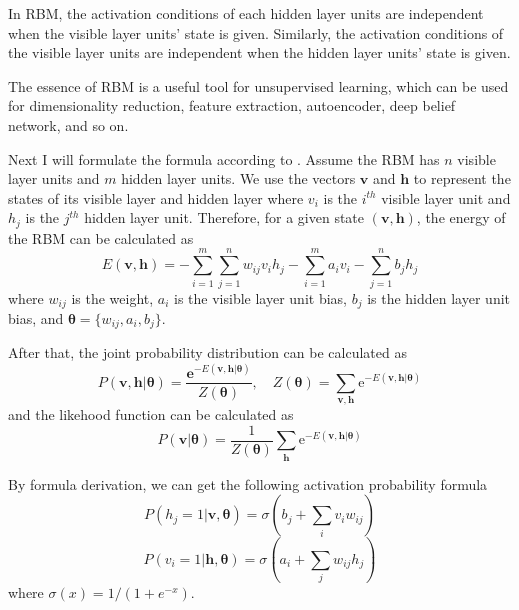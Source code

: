 \documentclass{bioinfo}
\begin{document}
In RBM, the activation conditions of each hidden layer units are independent when the visible layer units' state is given. Similarly, the activation conditions of the visible layer units are independent when the hidden layer units' state is given.

The essence of RBM is a useful tool for unsupervised learning, which can be used for dimensionality reduction, feature extraction, autoencoder, deep belief network, and so on.

Next I will formulate the formula according to \cite{zhangchunxia}. Assume the RBM has $n$ visible layer units and $m$ hidden layer units. We use the vectors $\mathbf{v}$ and $\mathbf{h}$ to represent the states of its visible layer and hidden layer where $v_i$ is the $i^{th}$ visible layer unit and $h_j$ is the $j^{th}$ hidden layer unit. Therefore, for a given state $(\mathbf{v}, \mathbf{h})$, the energy of the RBM can be calculated as
\begin{equation}
E(\mathbf{v}, \mathbf{h})=-\sum_{i=1}^{m} \sum_{j=1}^{n} w_{i j} v_{i} h_{j}-\sum_{i=1}^{m} a_{i} v_{i}-\sum_{j=1}^{n} b_{j} h_{j}
\end{equation}
where $w_{ij}$ is the weight, $a_{i}$ is the visible layer unit bias, $b_{j}$ is the hidden layer unit bias, and $\boldsymbol{\theta}=\{w_{ij}, a_i, b_j\}$.

After that, the joint probability distribution can be calculated as 
\begin{equation}
P(\mathbf{v}, \mathbf{h} | \boldsymbol{\theta})=\frac{\mathbf{e}^{-E(\mathbf{v}, \mathbf{h} | \boldsymbol{\theta})}}{Z(\boldsymbol{\theta})}, \quad Z(\boldsymbol{\theta})=\sum_{\mathbf{v}, \mathbf{h}} \mathrm{e}^{-E(\mathbf{v}, \mathbf{h} | \boldsymbol{\theta})}
\end{equation}
and the likehood function can be calculated as
\begin{equation}
P(\mathbf{v} | \boldsymbol{\theta})=\frac{1}{Z(\boldsymbol{\theta})} \sum_{\mathbf{h}} \mathrm{e}^{-E(\mathbf{v}, \mathbf{h} | \boldsymbol{\theta})}
\end{equation}

By formula derivation, we can get the following activation probability formula
\begin{equation}
P\left(h_{j}=1 | \mathbf{v}, \boldsymbol{\theta}\right)=\sigma\left(b_{j}+\sum_{i} v_{i} w_{i j}\right)
\end{equation}
\begin{equation}
P\left(v_{i}=1 | \mathbf{h}, \boldsymbol{\theta}\right)=\sigma\left(a_{i}+\sum_{j} w_{i j} h_{j}\right)
\end{equation}
where $\sigma(x)=1/(1+e^{-x})$.
\end{document}
